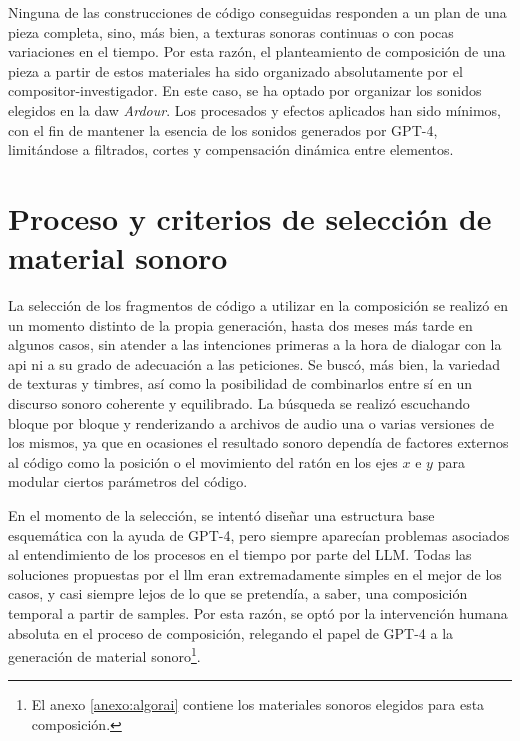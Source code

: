 Ninguna de las construcciones de código conseguidas responden a un plan de una pieza completa, sino, más bien, a texturas sonoras continuas o con pocas variaciones en el tiempo. Por esta razón, el planteamiento de composición de una pieza a partir de estos materiales ha sido organizado absolutamente por el compositor-investigador. En este caso, se ha optado por organizar los sonidos elegidos en la \gls{daw} \emph{Ardour}. Los procesados y efectos aplicados han sido mínimos, con el fin de mantener la esencia de los sonidos generados por GPT-4, limitándose a filtrados, cortes y compensación dinámica entre elementos. 




\section{Proceso y criterios de selección de material sonoro}

La selección de los fragmentos de código a utilizar en la composición se realizó en un momento distinto de la propia generación, hasta dos meses más tarde en algunos casos, sin atender a las intenciones primeras a la hora de dialogar con la \gls{api} ni a su grado de adecuación a las peticiones. Se buscó, más bien, la variedad de texturas y timbres, así como la posibilidad de combinarlos entre sí en un discurso sonoro coherente y equilibrado. La búsqueda se realizó escuchando bloque por bloque y renderizando a archivos de audio una o varias versiones de los mismos, ya que en ocasiones el resultado sonoro dependía de factores externos al código como la posición o el movimiento del ratón en los ejes $x$ e $y$ para modular ciertos parámetros del código. 

En el momento de la selección, se intentó diseñar una estructura base esquemática con la ayuda de GPT-4, pero siempre aparecían problemas asociados al entendimiento de los procesos en el tiempo por parte del LLM. Todas las soluciones propuestas por el \gls{llm} eran extremadamente simples en el mejor de los casos, y casi siempre lejos de lo que se pretendía, a saber, una composición temporal a partir de samples. Por esta razón, se optó por la intervención humana absoluta en el proceso de composición, relegando el papel de GPT-4 a la generación de material sonoro\footnote{El anexo \ref{anexo:algorai} contiene los materiales sonoros elegidos para esta composición.}.

